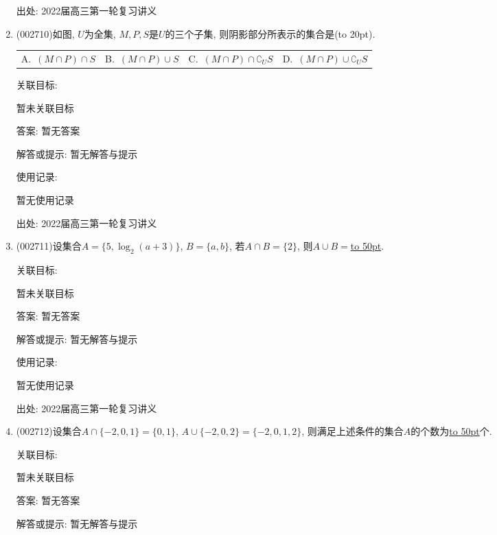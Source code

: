 \documentclass[10pt,a4paper]{article}
\newcommand{\blank}[1]{\underline{\hbox to #1pt{}}}
\newcommand{\bracket}[1]{(\hbox to #1pt{})}
\newcommand{\fourch}[4]{\par\begin{tabular}{p{.23\textwidth}p{.23\textwidth}p{.23\textwidth}p{.23\textwidth}}
A.~#1 &B.~#2& C.~#3& D.~#4
\end{tabular}}
\begin{document}
\begin{enumerate}[1.]
出处: 2022届高三第一轮复习讲义
\item { (002710)}如图, $U$为全集, $M,P,S$是$U$的三个子集, 则阴影部分所表示的集合是\bracket{20}.
\fourch{$(M\cap P)\cap S$}{$(M\cap P)\cup S$}{$(M\cap P)\cap \complement_U S$}{$(M\cap P)\cup \complement_U S$}
\begin{center}
\end{center}


关联目标:

暂未关联目标

答案: 暂无答案

解答或提示: 暂无解答与提示

使用记录:

暂无使用记录


出处: 2022届高三第一轮复习讲义
\item { (002711)}设集合$A=\{5,\log_2(a+3)\}$, $B=\{a,b\}$, 若$A\cap B=\{2\}$, 则$A\cup B=$\blank{50}.


关联目标:

暂未关联目标

答案: 暂无答案

解答或提示: 暂无解答与提示

使用记录:

暂无使用记录


出处: 2022届高三第一轮复习讲义
\item { (002712)}设集合$A\cap \{-2,0,1\}=\{0,1\}$, $A\cup \{-2,0,2\}=\{-2,0,1,2\}$, 则满足上述条件的集合$A$的个数为\blank{50}个.


关联目标:

暂未关联目标

答案: 暂无答案

解答或提示: 暂无解答与提示


\end{enumerate}
\end{document}
